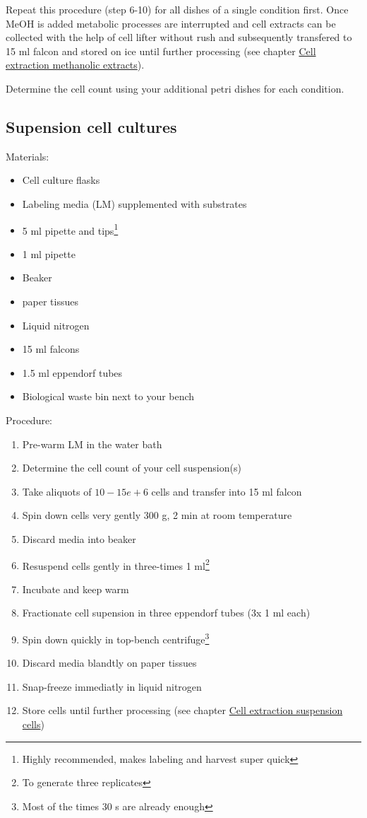 \documentclass[]{book}
\providecommand{\tightlist}{%
  \setlength{\itemsep}{0pt}\setlength{\parskip}{0pt}}
\let\rmarkdownfootnote\footnote%
\def\footnote{\protect\rmarkdownfootnote}
\theoremstyle{definition}
\theoremstyle{definition}
\theoremstyle{definition}
\theoremstyle{remark}
\begin{document}
Repeat this procedure (step 6-10) for all dishes of a single condition
first. Once MeOH is added metabolic processes are interrupted and cell
extracts can be collected with the help of cell lifter without rush and
subsequently transfered to 15 ml falcon and stored on ice until further
processing (see chapter \protect\hyperlink{ccextraction_meoh}{Cell
extraction methanolic extracts}).

Determine the cell count using your additional petri dishes for each
condition.

\hypertarget{psirm:suspension}{\subsection{Supension cell
cultures}\label{psirm:suspension}}

Materials:

\begin{itemize}
\tightlist
\item
  Cell culture flasks
\item
  Labeling media (LM) supplemented with substrates
\item
  5 ml pipette and tips\footnote{Highly recommended, makes labeling and
    harvest super quick}
\item
  1 ml pipette
\item
  Beaker
\item
  paper tissues
\item
  Liquid nitrogen
\item
  15 ml falcons
\item
  1.5 ml eppendorf tubes
\item
  Biological waste bin next to your bench
\end{itemize}

Procedure:

\begin{enumerate}
\def\labelenumi{\arabic{enumi}.}
\tightlist
\item
  Pre-warm LM in the water bath
\item
  Determine the cell count of your cell suspension(s)
\item
  Take aliquots of \(10-15e+6\) cells and transfer into 15 ml falcon
\item
  Spin down cells very gently 300 g, 2 min at room temperature
\item
  Discard media into beaker
\item
  Resuspend cells gently in three-times 1 ml\footnote{To generate three
    replicates}
\item
  Incubate and keep warm
\item
  Fractionate cell supension in three eppendorf tubes (3x 1 ml each)
\item
  Spin down quickly in top-bench centrifuge\footnote{Most of the times
    30 s are already enough}
\item
  Discard media blandtly on paper tissues
\item
  Snap-freeze immediatly in liquid nitrogen
\item
  Store cells until further processing (see chapter
  \protect\hyperlink{ccextraction_susp}{Cell extraction suspension
  cells})
\end{enumerate}
\end{document}
